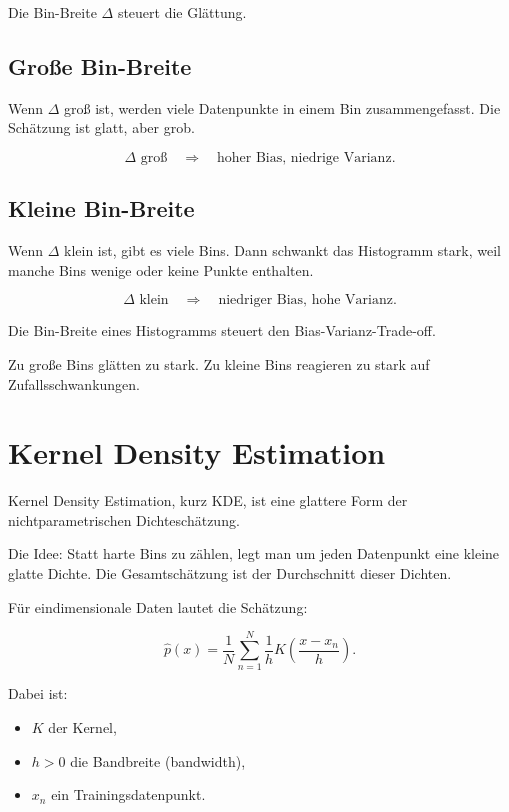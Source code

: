 Die Bin-Breite \(\Delta\) steuert die Glättung.

\subsection{Große Bin-Breite}

Wenn \(\Delta\) groß ist, werden viele Datenpunkte in einem Bin zusammengefasst.
Die Schätzung ist glatt, aber grob.

\[
    \Delta \text{ groß}
    \quad
    \Rightarrow
    \quad
    \text{hoher Bias, niedrige Varianz}.
\]

\subsection{Kleine Bin-Breite}

Wenn \(\Delta\) klein ist, gibt es viele Bins.
Dann schwankt das Histogramm stark, weil manche Bins wenige oder keine Punkte enthalten.

\[
    \Delta \text{ klein}
    \quad
    \Rightarrow
    \quad
    \text{niedriger Bias, hohe Varianz}.
\]

\begin{conceptbox}
Die Bin-Breite eines Histogramms steuert den Bias-Varianz-Trade-off.

Zu große Bins glätten zu stark.
Zu kleine Bins reagieren zu stark auf Zufallsschwankungen.
\end{conceptbox}

\section{Kernel Density Estimation}

Kernel Density Estimation, kurz KDE, ist eine glattere Form der nichtparametrischen Dichteschätzung.

Die Idee:
Statt harte Bins zu zählen, legt man um jeden Datenpunkt eine kleine glatte Dichte.
Die Gesamtschätzung ist der Durchschnitt dieser Dichten.

Für eindimensionale Daten lautet die Schätzung:

\[
    \hat{p}(x)
    =
    \frac{1}{N}
    \sum_{n=1}^{N}
    \frac{1}{h}
    K
    \left(
        \frac{x-x_n}{h}
    \right).
\]

Dabei ist:

\begin{itemize}
    \item \(K\) der Kernel,
    \item \(h>0\) die Bandbreite (bandwidth),
    \item \(x_n\) ein Trainingsdatenpunkt.
\end{itemize}

